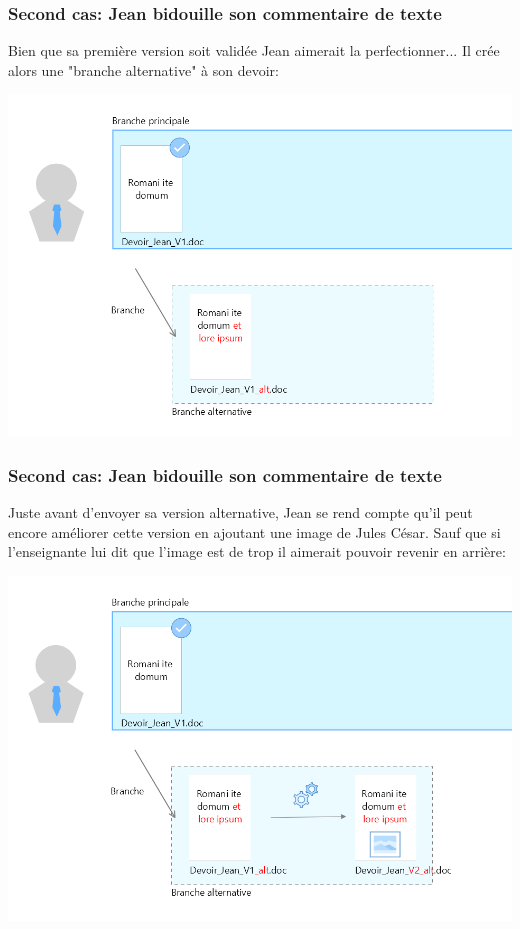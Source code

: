 \documentclass{beamer}
\begin{document}
\begin{frame}
\frametitle{Second cas: Jean bidouille son commentaire de texte}
Bien que sa première version soit validée Jean aimerait la perfectionner... Il crée alors une "branche alternative" à son devoir:
\begin{center}
    \includegraphics[scale=0.25]{images/secondScenario/secondScenario_diapo1.png}
\end{center}
\end{frame}

\begin{frame}
\frametitle{Second cas: Jean bidouille son commentaire de texte}
Juste avant d'envoyer sa version alternative, Jean se rend compte qu'il peut encore améliorer cette version en ajoutant une image de Jules César. Sauf que si l'enseignante lui dit que l'image est de trop il aimerait pouvoir revenir en arrière:
\begin{center}
    \includegraphics[scale=0.25]{images/secondScenario/secondScenario_diapo2.png}
\end{center}
\end{frame}
\end{document}
